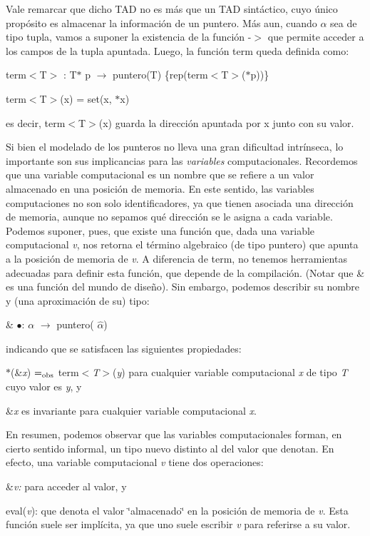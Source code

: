 Vale remarcar que dicho T\+AD no es más que un T\+AD sintáctico, cuyo único propósito es almacenar la información de un puntero. Más aun, cuando $\alpha$ sea de tipo tupla, vamos a suponer la existencia de la función -\/$>$ que permite acceder a los campos de la tupla apuntada. Luego, la función term queda definida como\+:
\begin{DoxyItemize}
\item term$<$\+T$>$ \+: T$\ast$ p $\to$ puntero(\+T) \{rep(term$<$\+T$>$($\ast$p))\}
\item term$<$\+T$>$(x) = set(x, $\ast$x)
\end{DoxyItemize}

es decir, term$<$\+T$>$(x) guarda la dirección apuntada por x junto con su valor.

Si bien el modelado de los punteros no lleva una gran dificultad intrínseca, lo importante son sus implicancias para las {\itshape variables} computacionales. Recordemos que una variable computacional es un nombre que se refiere a un valor almacenado en una posición de memoria. En este sentido, las variables computaciones no son solo identificadores, ya que tienen asociada una dirección de memoria, aunque no sepamos qué dirección se le asigna a cada variable. Podemos suponer, pues, que existe una función que, dada una variable computacional {\itshape v}, nos retorna el término algebraico (de tipo puntero) que apunta a la posición de memoria de {\itshape v}. A diferencia de term, no tenemos herramientas adecuadas para definir esta función, que depende de la compilación. (Notar que \& es una función del mundo de diseño). Sin embargo, podemos describir su nombre y (una aproximación de su) tipo\+:
\begin{DoxyItemize}
\item \& $\bullet$\+: $\alpha$ $\to$ puntero( $\widehat{\alpha}$)
\end{DoxyItemize}

indicando que se satisfacen las siguientes propiedades\+:
\begin{DoxyEnumerate}
\item $\ast$(\&{\itshape x}) $=_{\rm obs}$ term$<${\itshape T$>$}({\itshape y}) para cualquier variable computacional {\itshape x} de tipo {\itshape T} cuyo valor es {\itshape y}, y
\item \&{\itshape x} es invariante para cualquier variable computacional {\itshape x}.
\end{DoxyEnumerate}

En resumen, podemos observar que las variables computacionales forman, en cierto sentido informal, un tipo nuevo distinto al del valor que denotan. En efecto, una variable computacional {\itshape v} tiene dos operaciones\+:
\begin{DoxyEnumerate}
\item \&{\itshape v\+:} para acceder al valor, y
\item eval({\itshape v})\+: que denota el valor \char`\"{}almacenado\char`\"{} en la posición de memoria de {\itshape v}. Esta función suele ser implícita, ya que uno suele escribir {\itshape v} para referirse a su valor.
\end{DoxyEnumerate}

